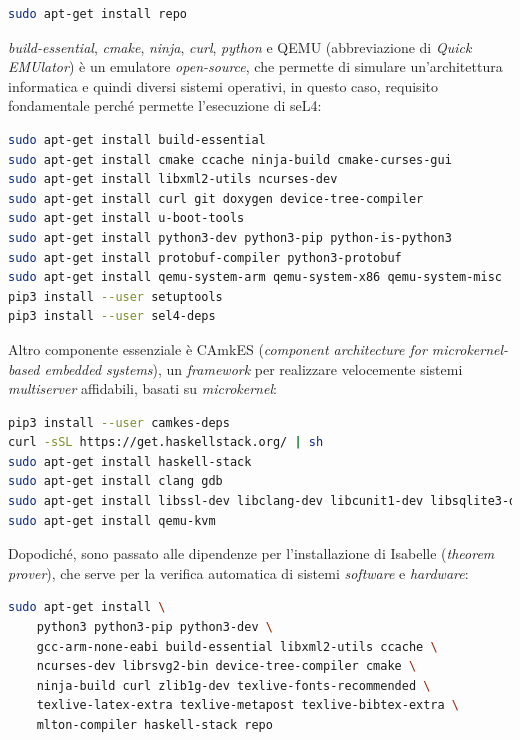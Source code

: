 \lstset{style=mystyle}

\begin{lstlisting}[language=bash]
sudo apt-get install repo
\end{lstlisting}

\textit{build-essential}, \textit{cmake}, \textit{ninja}, \textit{curl}, \textit{python} e QEMU (abbreviazione di \textit{Quick EMUlator}) è un emulatore \textit{open-source}, che permette di simulare un'architettura informatica e quindi diversi sistemi operativi, in questo caso, requisito fondamentale perché permette l'esecuzione di seL4:
\begin{lstlisting}[language=bash]
sudo apt-get install build-essential
sudo apt-get install cmake ccache ninja-build cmake-curses-gui
sudo apt-get install libxml2-utils ncurses-dev
sudo apt-get install curl git doxygen device-tree-compiler
sudo apt-get install u-boot-tools
sudo apt-get install python3-dev python3-pip python-is-python3
sudo apt-get install protobuf-compiler python3-protobuf
sudo apt-get install qemu-system-arm qemu-system-x86 qemu-system-misc
pip3 install --user setuptools
pip3 install --user sel4-deps
\end{lstlisting}

Altro componente essenziale è CAmkES (\textit{component architecture for \textit{microkernel}-based embedded systems}), un \textit{framework} per realizzare velocemente sistemi \textit{multiserver} affidabili, basati su \textit{microkernel}:
\begin{lstlisting}[language=bash]
pip3 install --user camkes-deps
curl -sSL https://get.haskellstack.org/ | sh
sudo apt-get install haskell-stack
sudo apt-get install clang gdb
sudo apt-get install libssl-dev libclang-dev libcunit1-dev libsqlite3-dev
sudo apt-get install qemu-kvm
\end{lstlisting}

Dopodiché, sono passato alle dipendenze per l'installazione di Isabelle (\textit{theorem prover}), che serve per la verifica automatica di sistemi \textit{software} e \textit{hardware}:
\begin{lstlisting}[language=bash]
sudo apt-get install \
    python3 python3-pip python3-dev \
    gcc-arm-none-eabi build-essential libxml2-utils ccache \
    ncurses-dev librsvg2-bin device-tree-compiler cmake \
    ninja-build curl zlib1g-dev texlive-fonts-recommended \
    texlive-latex-extra texlive-metapost texlive-bibtex-extra \
    mlton-compiler haskell-stack repo
\end{lstlisting}

